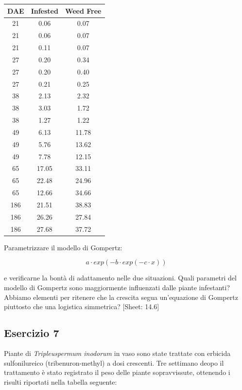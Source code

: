 \documentclass[a4paper,12pt,oneside]{book}
\begin{document}
\begin{longtable}[]{@{}ccc@{}}
\toprule()
DAE & Infested & Weed Free \\
\midrule()
\endhead
21 & 0.06 & 0.07 \\
21 & 0.06 & 0.07 \\
21 & 0.11 & 0.07 \\
27 & 0.20 & 0.34 \\
27 & 0.20 & 0.40 \\
27 & 0.21 & 0.25 \\
38 & 2.13 & 2.32 \\
38 & 3.03 & 1.72 \\
38 & 1.27 & 1.22 \\
49 & 6.13 & 11.78 \\
49 & 5.76 & 13.62 \\
49 & 7.78 & 12.15 \\
65 & 17.05 & 33.11 \\
65 & 22.48 & 24.96 \\
65 & 12.66 & 34.66 \\
186 & 21.51 & 38.83 \\
186 & 26.26 & 27.84 \\
186 & 27.68 & 37.72 \\
\bottomrule()
\end{longtable}

Parametrizzare il modello di Gompertz:

\[a \cdot exp(-b \cdot exp(-c \cdot x))\]

e verificarne la bontà di adattamento nelle due situazioni. Quali parametri del modello di Gompertz sono maggiormente influenzati dalle piante infestanti? Abbiamo elementi per ritenere che la crescita segua un'equazione di Gompertz piuttosto che una logistica simmetrica?
{[}Sheet: 14.6{]}

\hypertarget{esercizio-7-2}{%
\subsection{Esercizio 7}\label{esercizio-7-2}}

Piante di \emph{Tripleuspermum inodorum} in vaso sono state trattate con erbicida sulfonilureico (tribenuron-methyl) a dosi crescenti. Tre settimano deopo il trattamento è stato registrato il peso delle piante sopravvissute, ottenendo i risulti riportati nella tabella seguente:
\end{document}
